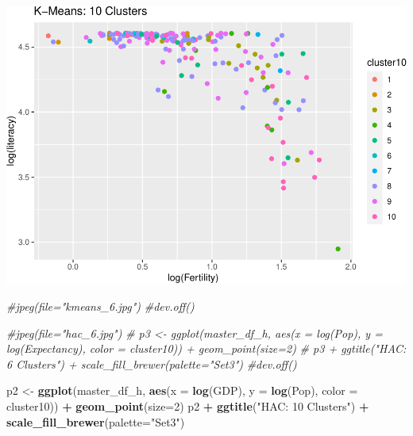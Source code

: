 \documentclass[]{article}
\newenvironment{Shaded}{\begin{snugshade}}{\end{snugshade}}
\newcommand{\CommentTok}[1]{\textcolor[rgb]{0.56,0.35,0.01}{\textit{#1}}}
\newcommand{\DataTypeTok}[1]{\textcolor[rgb]{0.13,0.29,0.53}{#1}}
\newcommand{\DecValTok}[1]{\textcolor[rgb]{0.00,0.00,0.81}{#1}}
\newcommand{\KeywordTok}[1]{\textcolor[rgb]{0.13,0.29,0.53}{\textbf{#1}}}
\newcommand{\NormalTok}[1]{#1}
\newcommand{\OperatorTok}[1]{\textcolor[rgb]{0.81,0.36,0.00}{\textbf{#1}}}
\newcommand{\StringTok}[1]{\textcolor[rgb]{0.31,0.60,0.02}{#1}}
\begin{document}
\includegraphics{eda_files/figure-latex/unnamed-chunk-29-10.pdf}

\begin{Shaded}
\begin{Highlighting}[]
\CommentTok{#jpeg(file="kmeans_6.jpg")}
\CommentTok{#dev.off()}

\CommentTok{#jpeg(file="hac_6.jpg")}
\CommentTok{# p3 <- ggplot(master_df_h, aes(x = log(Pop), y = log(Expectancy), color = cluster10)) + geom_point(size=2) }
\CommentTok{# p3 + ggtitle("HAC: 6 Clusters") + scale_fill_brewer(palette="Set3")}
\CommentTok{#dev.off()}
\end{Highlighting}
\end{Shaded}

\begin{Shaded}
\begin{Highlighting}[]
\NormalTok{p2 <-}\StringTok{ }\KeywordTok{ggplot}\NormalTok{(master_df_h, }\KeywordTok{aes}\NormalTok{(}\DataTypeTok{x =} \KeywordTok{log}\NormalTok{(GDP), }\DataTypeTok{y =} \KeywordTok{log}\NormalTok{(Pop), }\DataTypeTok{color =}\NormalTok{ cluster10)) }\OperatorTok{+}
\StringTok{  }\KeywordTok{geom_point}\NormalTok{(}\DataTypeTok{size=}\DecValTok{2}\NormalTok{)}
\NormalTok{p2 }\OperatorTok{+}\StringTok{ }\KeywordTok{ggtitle}\NormalTok{(}\StringTok{"HAC: 10 Clusters"}\NormalTok{) }\OperatorTok{+}\StringTok{ }\KeywordTok{scale_fill_brewer}\NormalTok{(}\DataTypeTok{palette=}\StringTok{"Set3"}\NormalTok{)}
\end{Highlighting}
\end{Shaded}
\end{document}
